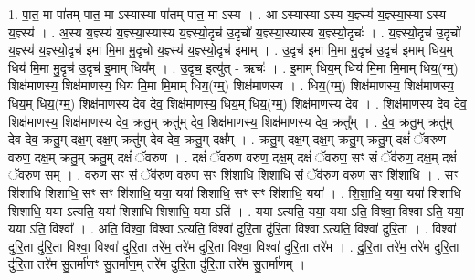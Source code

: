 \documentclass[17pt]{extarticle}
\begin{document}
1. पा॒त॒ मा पा॑तम् पात॒ मा ऽस्यास्या पा॑तम् पात॒ मा ऽस्य । . आ ऽस्यास्या ऽस्य य॒ज्ञ्स्य॑ य॒ज्ञ्स्या॒स्या ऽस्य य॒ज्ञ्स्य॑ । . अ॒स्य य॒ज्ञ्स्य॑ य॒ज्ञ्स्या॒स्यास्य य॒ज्ञ्स्यो॒दृच॑ उ॒दृचो॑ य॒ज्ञ्स्या॒स्यास्य य॒ज्ञ्स्यो॒दृचः॑ । . य॒ज्ञ्स्यो॒दृच॑ उ॒दृचो॑ य॒ज्ञ्स्य॑ य॒ज्ञ्स्यो॒दृच॑ इ॒मा मि॒मा मु॒दृचो॑ य॒ज्ञ्स्य॑ य॒ज्ञ्स्यो॒दृच॑ इ॒माम् । . उ॒दृच॑ इ॒मा मि॒मा मु॒दृच॑ उ॒दृच॑ इ॒माम् धिय॒म् धिय॑ मि॒मा मु॒दृच॑ उ॒दृच॑ इ॒माम् धिय᳚म् । . उ॒दृच॒ इत्यु॑त् - ऋचः॑ । . इ॒माम् धिय॒म् धिय॑ मि॒मा मि॒माम् धिय॒(ग्म्॒) शिक्ष॑माणस्य॒ शिक्ष॑माणस्य॒ धिय॑ मि॒मा मि॒माम् 
धिय॒(ग्म्॒) शिक्ष॑माणस्य । . धिय॒(ग्म्॒) शिक्ष॑माणस्य॒ शिक्ष॑माणस्य॒ धिय॒म् धिय॒(ग्म्॒) शिक्ष॑माणस्य देव देव॒ शिक्ष॑माणस्य॒ धिय॒म् धिय॒(ग्म्॒) शिक्ष॑माणस्य देव । . शिक्ष॑माणस्य देव देव॒ शिक्ष॑माणस्य॒ शिक्ष॑माणस्य देव॒ क्रतु॒म् क्रतु॑म् देव॒ शिक्ष॑माणस्य॒ शिक्ष॑माणस्य देव॒ क्रतु᳚म् । . दे॒व॒ क्रतु॒म् क्रतु॑म् देव देव॒ क्रतु॒म् दक्ष॒म् दक्ष॒म् क्रतु॑म् देव देव॒ क्रतु॒म् दक्ष᳚म् । . क्रतु॒म् दक्ष॒म् दक्ष॒म् क्रतु॒म् क्रतु॒म् दक्षं॑ ॅवरुण वरुण॒ दक्ष॒म् क्रतु॒म् क्रतु॒म् दक्षं॑ ॅवरुण । . दक्षं॑ ॅवरुण वरुण॒ दक्ष॒म् दक्षं॑ ॅवरुण॒ सꣳ सं ॅव॑रुण॒ दक्ष॒म् दक्षं॑ ॅवरुण॒ सम् । . व॒रु॒ण॒ सꣳ सं ॅव॑रुण वरुण॒ सꣳ शि॑शाधि शिशाधि॒ सं ॅव॑रुण वरुण॒ सꣳ शि॑शाधि । . सꣳ शि॑शाधि शिशाधि॒ सꣳ सꣳ शि॑शाधि॒ यया॒ यया॑ शिशाधि॒ सꣳ सꣳ शि॑शाधि॒ यया᳚ । . शि॒शा॒धि॒ यया॒ यया॑ शिशाधि शिशाधि॒ यया ऽत्यति॒ यया॑ शिशाधि शिशाधि॒ यया ऽति॑ । . यया ऽत्यति॒ यया॒ यया ऽति॒ विश्वा॒ विश्वा ऽति॒ यया॒ यया ऽति॒ विश्वा᳚ । . अति॒ विश्वा॒ विश्वा ऽत्यति॒ विश्वा॑ दुरि॒ता दु॑रि॒ता विश्वा ऽत्यति॒ विश्वा॑ दुरि॒ता । . विश्वा॑ दुरि॒ता दु॑रि॒ता विश्वा॒ विश्वा॑ दुरि॒ता तरे॑म॒ तरे॑म दुरि॒ता विश्वा॒ विश्वा॑ दुरि॒ता तरे॑म । . दु॒रि॒ता तरे॑म॒ तरे॑म दुरि॒ता दु॑रि॒ता तरे॑म सु॒तर्मा॑णꣳ सु॒तर्मा॑ण॒म् तरे॑म दुरि॒ता दु॑रि॒ता तरे॑म सु॒तर्मा॑णम् । \newline
\end{document}
